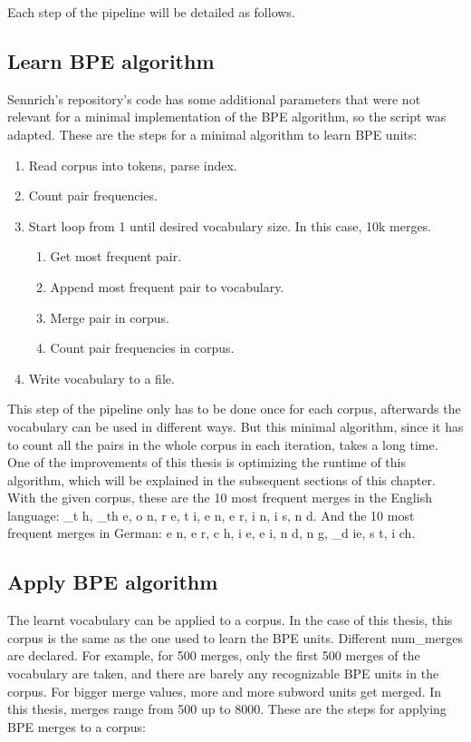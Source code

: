 Each step of the pipeline will be detailed as follows.

\subsection{Learn BPE algorithm}\label{met:learnbpe}

Sennrich's repository's code has some additional parameters that were not relevant for a minimal implementation of the BPE algorithm, so the script was adapted. These are the steps for a minimal algorithm to learn BPE units:

\begin{enumerate}
	\item Read corpus into tokens, parse index.
	\item Count pair frequencies.
	\item Start loop from 1 until desired vocabulary size. In this case, 10k merges.
	\begin{enumerate}
		\item Get most frequent pair.
		\item Append most frequent pair to vocabulary.
		\item Merge pair in corpus.
		\item Count pair frequencies in corpus.
	\end{enumerate}
	\item Write vocabulary to a file.
\end{enumerate}

This step of the pipeline only has to be done once for each corpus, afterwards the vocabulary can be used in different ways. But this minimal algorithm, since it has to count all the pairs in the whole corpus in each iteration, takes a long time. One of the improvements of this thesis is optimizing the runtime of this algorithm, which will be explained in the subsequent sections of this chapter. With the given corpus, these are the 10 most frequent merges in the English language: \_t h, \_th e, o n, r e, t i, e n, e r, i n, i s, n d. And the 10 most frequent merges in German: e n, e r, c h, i e, e i, n d, n g, \_d ie, s t, i ch.

\subsection{Apply BPE algorithm}\label{met:applybpe}

The learnt vocabulary can be applied to a corpus. In the case of this thesis, this corpus is the same as the one used to learn the BPE units. Different num\_merges are declared. For example, for 500 merges, only the first 500 merges of the vocabulary are taken, and there are barely any recognizable BPE units in the corpus. For bigger merge values, more and more subword units get merged. In this thesis, merges range from 500 up to 8000. These are the steps for applying BPE merges to a corpus:

